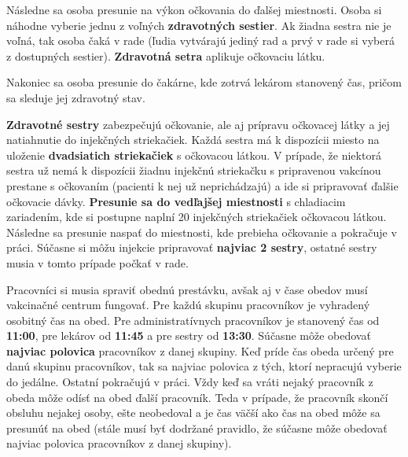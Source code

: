 \documentclass[letterpaper]{article}
\begin{document}
	Následne sa osoba presunie na výkon očkovania do ďalšej miestnosti. Osoba si náhodne vyberie jednu z voľných \textbf{zdravotných sestier}. Ak žiadna sestra nie je voľná, tak osoba čaká v rade (ľudia vytvárajú jediný rad a prvý v rade si vyberá z dostupných sestier). \textbf{Zdravotná setra} aplikuje očkovaciu látku.
	
	Nakoniec sa osoba presunie do čakárne, kde zotrvá lekárom stanovený čas, pričom sa sleduje jej zdravotný stav.
	
	\textbf{Zdravotné sestry} zabezpečujú očkovanie, ale aj prípravu očkovacej látky a jej natiahnutie do injekčných striekačiek. Každá sestra má k dispozícii miesto na uloženie \textbf{dvadsiatich striekačiek} s očkovacou látkou. V prípade, že niektorá sestra už nemá k dispozícii žiadnu injekčnú striekačku s pripravenou vakcínou prestane s očkovaním (pacienti k nej už neprichádzajú) a ide si pripravovať ďalšie očkovacie dávky. \textbf{Presunie sa do vedľajšej miestnosti} s chladiacim zariadením, kde si postupne naplní 20 injekčných striekačiek očkovacou látkou. Následne sa presunie naspať do miestnosti, kde prebieha očkovanie a pokračuje v práci. Súčasne si môžu injekcie pripravovať \textbf{najviac 2 sestry}, ostatné sestry musia v tomto prípade počkať v rade.
	
	Pracovníci si musia spraviť obednú prestávku, avšak aj v čase obedov musí vakcinačné centrum fungovať. Pre každú skupinu pracovníkov je vyhradený osobitný čas na obed. Pre administratívnych pracovníkov je stanovený čas od \textbf{11:00}, pre lekárov od \textbf{11:45} a pre sestry od \textbf{13:30}. Súčasne môže obedovať \textbf{najviac polovica} pracovníkov z danej skupiny. Keď príde čas obeda určený pre danú skupinu pracovníkov, tak sa najviac polovica z tých, ktorí nepracujú vyberie do jedálne. Ostatní pokračujú v práci. Vždy keď sa vráti nejaký pracovník z obeda môže odísť na obed ďalší pracovník. Teda v prípade, že pracovník skončí obsluhu nejakej osoby, ešte neobedoval a je čas väčší ako čas na obed môže sa presunúť na obed (stále musí byť dodržané pravidlo, že súčasne môže obedovať najviac polovica pracovníkov z danej skupiny). 
	
\end{document}
